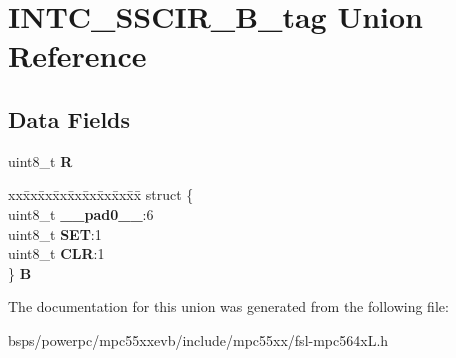 \hypertarget{unionINTC__SSCIR__8B__tag}{}\section{I\+N\+T\+C\+\_\+\+S\+S\+C\+I\+R\+\_\+B\+\_\+tag Union Reference}
\label{unionINTC__SSCIR__8B__tag}
\subsection*{Data Fields}
\begin{DoxyCompactItemize}
\item 
\mbox{\label{unionINTC__SSCIR__8B__tag_ad04e8a816e966dfedb129c0114955120}} 
uint8\+\_\+t {\bfseries R}
\item 
\mbox{\label{unionINTC__SSCIR__8B__tag_a3213b54d152aa76b512de861157f53cb}} 
\begin{tabbing}
xx\=xx\=xx\=xx\=xx\=xx\=xx\=xx\=xx\=\kill
struct \{\\
\>uint8\_t {\bfseries \_\_pad0\_\_}:6\\
\>uint8\_t {\bfseries SET}:1\\
\>uint8\_t {\bfseries CLR}:1\\
\} {\bfseries B}\\

\end{tabbing}\end{DoxyCompactItemize}


The documentation for this union was generated from the following file\+:\begin{DoxyCompactItemize}
\item 
bsps/powerpc/mpc55xxevb/include/mpc55xx/fsl-\/mpc564x\+L.\+h\end{DoxyCompactItemize}
